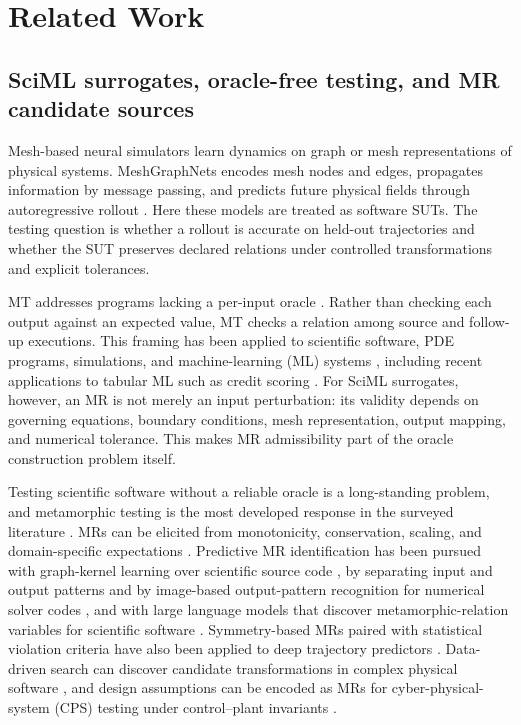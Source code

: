 \documentclass[preprint,12pt]{elsarticle}
\begin{document}
\section{Related Work}
\label{sec:related}

\subsection{SciML surrogates, oracle-free testing, and MR candidate sources}
\label{subsec:mesh-simulation}
\label{subsec:mt-oracle}
\label{subsec:mr-identification}

Mesh-based neural simulators learn dynamics on graph or mesh representations of physical systems. MeshGraphNets encodes mesh nodes and edges, propagates information by message passing, and predicts future physical fields through autoregressive rollout \citep{pfaff2021meshgraphnets}. Here these models are treated as software SUTs. The testing question is whether a rollout is accurate on held-out trajectories and whether the SUT preserves declared relations under controlled transformations and explicit tolerances.

MT addresses programs lacking a per-input oracle \citep{chen1998metamorphic,segura2016survey,chen2018mtSurvey}. Rather than checking each output against an expected value, MT checks a relation among source and follow-up executions. This framing has been applied to scientific software, PDE programs, simulations, and machine-learning (ML) systems \citep{chen2002pde,chen2011ml,kanewala2019scientific,olsen2019simulation}, including recent applications to tabular ML such as credit scoring \citep{ying2025}. For SciML surrogates, however, an MR is not merely an input perturbation: its validity depends on governing equations, boundary conditions, mesh representation, output mapping, and numerical tolerance. This makes MR admissibility part of the oracle construction problem itself.

Testing scientific software without a reliable oracle is a long-standing problem, and metamorphic testing is the most developed response in the surveyed literature \citep{kanewalaBieman2014slr}. MRs can be elicited from monotonicity, conservation, scaling, and domain-specific expectations \citep{kanewala2019scientific,lin2020exploratory,olsen2019simulation,raunak2021continuum}. Predictive MR identification has been pursued with graph-kernel learning over scientific source code \citep{kanewala2016graphkernel}, by separating input and output patterns and by image-based output-pattern recognition for numerical solver codes \citep{wang2022mridentification,fu2021burnup}, and with large language models that discover metamorphic-relation variables for scientific software \citep{tsigkanos2023}. Symmetry-based MRs paired with statistical violation criteria have also been applied to deep trajectory predictors \citep{spieker2024trajectory,spieker2025multimodal}. Data-driven search can discover candidate transformations in complex physical software \citep{hiremath2021ocean}, and design assumptions can be encoded as MRs for cyber-physical-system (CPS) testing under control--plant invariants \citep{mandrioli2025cps}.
\end{document}
